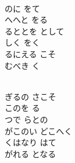 \documentclass[10pt,b5j]{tarticle} %
\begin{document}
\begin{enumerate}
\begin{minipage}[c]{\blocksize}
        \vspace{\linespace}
        \item[]~\\
        のに をて\\
        へへと をる\\
        るととを として\\
        しく をく\\
        るにえる こそ\\
        むべき く
        
    \end{minipage}
    \begin{minipage}[c]{\blocksize}
        
        \vspace{\linespace}
        \item[]~\\
        ぎるの さこそ\\
        このを る\\
        つで らとの\\
        がこのい どこへく\\
        くはなり はて\\
        がれる となる
    
    \end{minipage}
\end{enumerate} %
\end{document}
